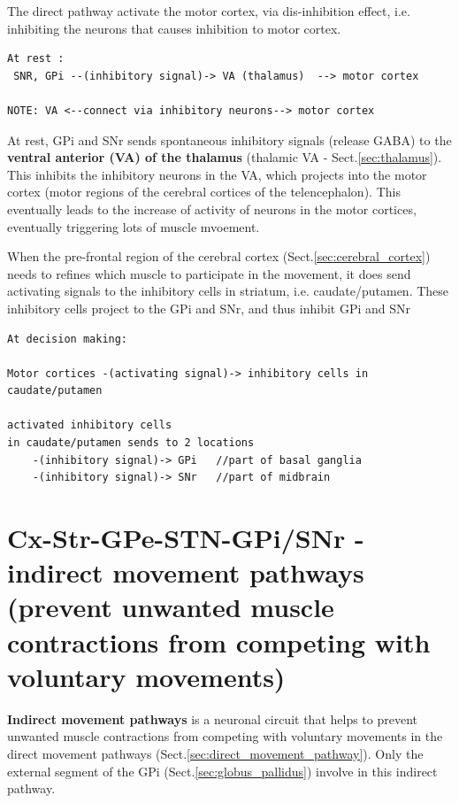 The direct pathway activate the motor cortex, via dis-inhibition effect, i.e.
inhibiting the neurons that causes inhibition to motor cortex.
\begin{verbatim}
At rest :
 SNR, GPi --(inhibitory signal)-> VA (thalamus)  --> motor cortex
 
NOTE: VA <--connect via inhibitory neurons--> motor cortex 
\end{verbatim}

At rest, GPi and SNr sends spontaneous inhibitory signals (release GABA) to the
{\bf ventral anterior (VA) of the thalamus} (thalamic VA -
Sect.\ref{sec:thalamus}). This inhibits the inhibitory neurons in the VA, which
projects into the motor cortex (motor regions of the cerebral cortices of the
telencephalon). This eventually leads to the increase of activity of neurons in
the motor cortices, eventually triggering lots of muscle mvoement.

When the pre-frontal region of the cerebral cortex (Sect.\ref{sec:cerebral_cortex})
needs to refines which muscle to participate in the movement, it does
send activating signals to the inhibitory cells in striatum,
i.e. caudate/putamen. These inhibitory cells project to the GPi and SNr, and
thus inhibit GPi and SNr

\begin{verbatim}
At decision making:

Motor cortices -(activating signal)-> inhibitory cells in caudate/putamen

activated inhibitory cells 
in caudate/putamen sends to 2 locations 
    -(inhibitory signal)-> GPi   //part of basal ganglia
    -(inhibitory signal)-> SNr   //part of midbrain
\end{verbatim} 
 


\section{Cx-Str-GPe-STN-GPi/SNr - indirect movement pathways (prevent unwanted
muscle contractions from competing with voluntary movements)}
\label{sec:indirect_movement_pathway}

{\bf Indirect movement pathways} is a neuronal circuit that helps to prevent
unwanted muscle contractions from competing with voluntary movements in the
direct movement pathways (Sect.\ref{sec:direct_movement_pathway}).
Only the external segment of the GPi (Sect.\ref{sec:globus_pallidus})
involve in this indirect pathway.


